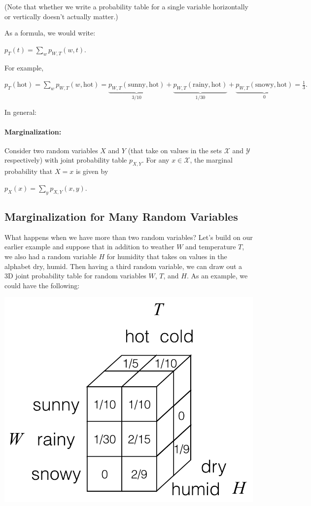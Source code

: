 \documentclass[6008notes.tex]{subfiles}
\begin{document}
(Note that whether we write a probability table for a single variable horizontally or vertically doesn't actually matter.)

As a formula, we would write:

$p_{T}(t)=\sum _{w}p_{W,T}(w,t).$
 
For example,

$p_{T}(\text {hot})=\sum _{w}p_{W,T}(w,\text {hot})=\underbrace{p_{W,T}(\text {sunny},\text {hot})}_{3/10}+\underbrace{p_{W,T}(\text {rainy},\text {hot})}_{1/30}+\underbrace{p_{W,T}(\text {snowy},\text {hot})}_{0}=\frac{1}{3}.$
 
In general:

\paragraph{Marginalization:} Consider two random variables $X$ and $Y$ (that take on values in the sets $\mathcal{X}$ and $\mathcal{Y}$ respectively) with joint probability table $p_{X,Y}$. For any $x\in \mathcal{X}$, the marginal probability that $X=x$ is given by

$p_{X}(x)=\sum _{y}p_{X,Y}(x,y).$
 
\subsection{Marginalization for Many Random Variables}

What happens when we have more than two random variables? Let's build on our earlier example and suppose that in addition to weather $W$ and temperature $T$, we also had a random variable $H$ for humidity that takes on values in the alphabet {dry, humid}. Then having a third random variable, we can draw out a 3D joint probability table for random variables $W$, $T$, and $H$. As an example, we could have the following:

{\includegraphics[scale=0.4]{images_sec-joint-rv-marg-many-rv-joint-table}}
\end{document}
